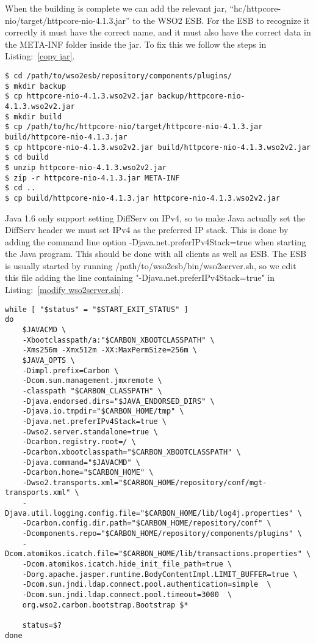 	When the building is complete we can add the relevant jar, “hc/httpcore-nio/target/httpcore-nio-4.1.3.jar” to the WSO2 ESB. For the ESB to recognize it correctly it must have the correct name, and it must also have the correct data in the META-INF folder inside the jar. To fix this we follow the steps in Listing:~\ref{copy jar}.
\begin{lstlisting}[frame=single, caption={Create WSO2 compatible jars}, label=copy jar, breaklines=true]
$ cd /path/to/wso2esb/repository/components/plugins/
$ mkdir backup
$ cp httpcore-nio-4.1.3.wso2v2.jar backup/httpcore-nio-4.1.3.wso2v2.jar
$ mkdir build
$ cp /path/to/hc/httpcore-nio/target/httpcore-nio-4.1.3.jar build/httpcore-nio-4.1.3.jar
$ cp httpcore-nio-4.1.3.wso2v2.jar build/httpcore-nio-4.1.3.wso2v2.jar
$ cd build
$ unzip httpcore-nio-4.1.3.wso2v2.jar
$ zip -r httpcore-nio-4.1.3.jar META-INF
$ cd ..
$ cp build/httpcore-nio-4.1.3.jar httpcore-nio-4.1.3.wso2v2.jar
\end{lstlisting}

	Java 1.6 only support setting DiffServ on IPv4, so to make Java actually set the DiffServ header we must set IPv4 as the preferred IP stack. This is done by adding the command line option -Djava.net.preferIPv4Stack=true when starting the Java program. This should be done with all clients as well as ESB. The ESB is usually started by running /path/to/wso2esb/bin/wso2server.sh, so we edit this file adding the line containing "-Djava.net.preferIPv4Stack=true" in Listing:~\ref{modify wso2server.sh}.

\begin{lstlisting}[frame=single, caption={Changes made to wso2server.sh}, label=modify wso2server.sh, breaklines=true]
while [ "$status" = "$START_EXIT_STATUS" ]
do
    $JAVACMD \
    -Xbootclasspath/a:"$CARBON_XBOOTCLASSPATH" \
    -Xms256m -Xmx512m -XX:MaxPermSize=256m \
    $JAVA_OPTS \
    -Dimpl.prefix=Carbon \
    -Dcom.sun.management.jmxremote \
    -classpath "$CARBON_CLASSPATH" \
    -Djava.endorsed.dirs="$JAVA_ENDORSED_DIRS" \
    -Djava.io.tmpdir="$CARBON_HOME/tmp" \
    -Djava.net.preferIPv4Stack=true \
    -Dwso2.server.standalone=true \
    -Dcarbon.registry.root=/ \
    -Dcarbon.xbootclasspath="$CARBON_XBOOTCLASSPATH" \
    -Djava.command="$JAVACMD" \
    -Dcarbon.home="$CARBON_HOME" \
    -Dwso2.transports.xml="$CARBON_HOME/repository/conf/mgt-transports.xml" \
    -Djava.util.logging.config.file="$CARBON_HOME/lib/log4j.properties" \
    -Dcarbon.config.dir.path="$CARBON_HOME/repository/conf" \
    -Dcomponents.repo="$CARBON_HOME/repository/components/plugins" \
    -Dcom.atomikos.icatch.file="$CARBON_HOME/lib/transactions.properties" \
    -Dcom.atomikos.icatch.hide_init_file_path=true \
    -Dorg.apache.jasper.runtime.BodyContentImpl.LIMIT_BUFFER=true \
    -Dcom.sun.jndi.ldap.connect.pool.authentication=simple  \
    -Dcom.sun.jndi.ldap.connect.pool.timeout=3000  \
    org.wso2.carbon.bootstrap.Bootstrap $*

    status=$?
done
\end{lstlisting}


